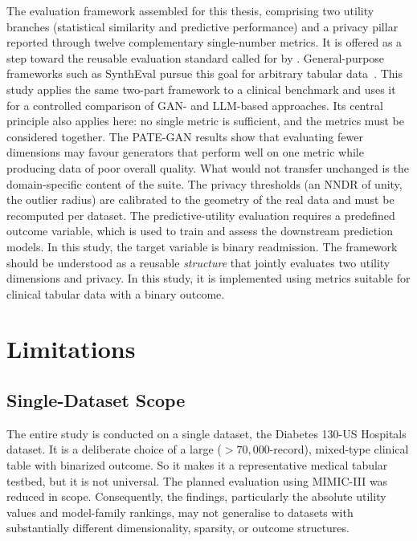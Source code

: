 The evaluation framework assembled for this thesis, comprising two utility
branches (statistical similarity and predictive performance) and a privacy
pillar reported through twelve complementary single-number metrics. It is
offered as a step toward the reusable evaluation standard called for by
\textcite{hernandez2022synthetic}. General-purpose frameworks such as SynthEval
pursue this goal for arbitrary tabular data~\cite{lautrup2025syntheval}. 
This study applies the same two-part framework to a clinical benchmark
and uses it for a controlled comparison of GAN- and LLM-based approaches. 
Its central principle also applies here: no single metric is sufficient,
and the metrics must be considered together. The PATE-GAN results show
that evaluating fewer dimensions may favour generators that perform well
on one metric while producing data of poor overall quality. What would not
transfer unchanged is the domain-specific content of the suite. The
privacy thresholds (an NNDR of unity, the outlier radius) are calibrated to
the geometry of the real data and must be recomputed per dataset. 
The predictive-utility evaluation requires a predefined outcome
variable, which is used to train and assess the downstream prediction
models. In this study, the target variable is binary readmission. 
The framework should be understood as a reusable \emph{structure} that
jointly evaluates two utility dimensions and privacy. In this study, it
is implemented using metrics suitable for clinical tabular data with a
binary outcome.

\section{Limitations}
\label{sec:discussion:limitations}

\subsection{Single-Dataset Scope}
\label{sec:discussion:limit:dataset}

The entire study is conducted on a single dataset, the Diabetes 130-US
Hospitals dataset. It is a deliberate choice of a large
($> 70{,}000$-record), mixed-type clinical table with binarized
outcome. So it makes it a representative medical tabular testbed, but it is
not universal. The planned evaluation using MIMIC-III was reduced in scope.
Consequently, the findings, particularly the absolute utility values and
model-family rankings, may not generalise to datasets with substantially
different dimensionality, sparsity, or outcome structures.

